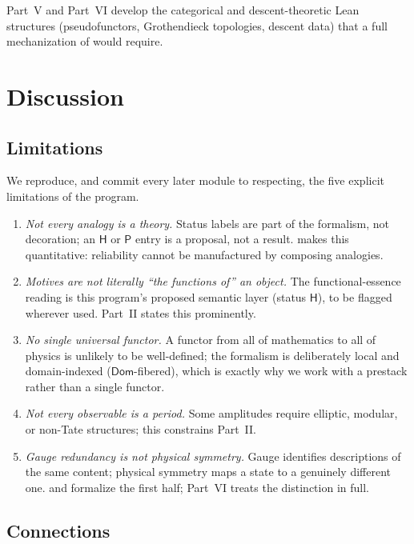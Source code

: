 \documentclass[12pt]{article}
\theoremstyle{definition}
\theoremstyle{remark}
\newcommand{\Dom}{\mathsf{Dom}}
\newcommand{\Hstat}{\mathsf{H}}
\newcommand{\Pstat}{\mathsf{P}}
\begin{document}
Part~V and Part~VI develop the categorical and descent-theoretic Lean structures
(pseudofunctors, Grothendieck topologies, descent data) that a full
mechanization of  would require.

\section{Discussion}
\label{sec:discussion}

\subsection{Limitations}

We reproduce, and commit every later module to respecting, the five explicit
limitations of the program.

\begin{enumerate}[leftmargin=2.2em]
\item \emph{Not every analogy is a theory.} Status labels are part of the
  formalism, not decoration; an $\Hstat$ or $\Pstat$ entry is a proposal, not a
  result.  makes this quantitative: reliability cannot be
  manufactured by composing analogies.
\item \emph{Motives are not literally ``the functions of'' an object.} The
  functional-essence reading is this program's proposed semantic layer (status
  $\Hstat$), to be flagged wherever used. Part~II states this prominently.
\item \emph{No single universal functor.} A functor from all of mathematics to
  all of physics is unlikely to be well-defined; the formalism is deliberately
  local and domain-indexed ($\Dom$-fibered), which is exactly why we work with a
  prestack rather than a single functor.
\item \emph{Not every observable is a period.} Some amplitudes require elliptic,
  modular, or non-Tate structures; this constrains Part~II.
\item \emph{Gauge redundancy is not physical symmetry.} Gauge identifies
  descriptions of the same content; physical symmetry maps a state to a genuinely
  different one.  and  formalize the
  first half; Part~VI treats the distinction in full.
\end{enumerate}

\subsection{Connections}
\end{document}
